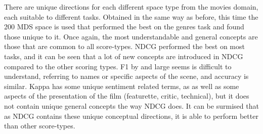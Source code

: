 There are unique directions for each different space type from the movies domain, each suitable to different tasks. Obtained in the same way as before, this time the 200 MDS space is used that performed the best on the genres task and found those unique to it. Once again, the most understandable and general concepts are those that are common to all score-types. NDCG performed the best on most tasks, and it can be seen that a lot of new concepts are introduced in NDCG compared to the other scoring types. F1 by and large seems is difficult to understand, referring to names or specific aspects of the scene, and accuracy is similar. Kappa has some unique sentiment related terms, as as well as some aspects of the presentation of the film (featurette, critic, technical), but it does not contain unique general concepts the way NDCG does. It can be surmised that as NDCG contains these unique conceptual directions, it is able to perform better than other score-types.
